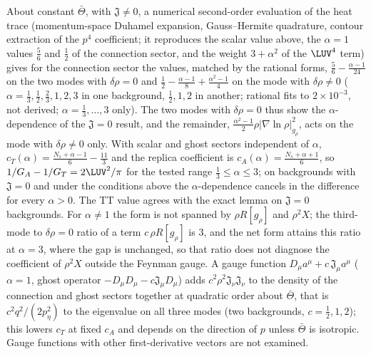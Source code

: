 About constant \(\bar\Theta\), with \(\mathfrak J\neq0\), a numerical second-order evaluation of the heat trace (momentum-space Duhamel expansion, Gauss--Hermite quadrature, contour extraction of the \(p^4\) coefficient; it reproduces the scalar value above, the \(\alpha=1\) values \(\tfrac56\) and \(\tfrac12\) of the connection sector, and the weight \(3+\alpha^2\) of the \(\LUV^4\) term) gives for the connection sector the values, matched by the rational forms, \(\tfrac56-\tfrac{\alpha-1}{24}\) on the two modes with \(\delta\rho=0\) and \(\tfrac12-\tfrac{\alpha-1}8+\tfrac{\alpha^2-1}4\) on the mode with \(\delta\rho\neq0\) (\(\alpha=\tfrac13,\tfrac12,\tfrac23,1,2,3\) in one background, \(\tfrac12,1,2\) in another; rational fits to \(2\times10^{-3}\), not derived; \(\alpha=\tfrac13,\dots,3\) only). The two modes with \(\delta\rho=0\) thus show the \(\alpha\)-dependence of the \(\mathfrak J=0\) result, and the remainder, \(\tfrac{\alpha^2-1}2\rho|\nabla\ln\rho|^2_{g_\rho}\), acts on the mode with \(\delta\rho\neq0\) only. With scalar and ghost sectors independent of \(\alpha\), \(c_T(\alpha)=\tfrac{N_s+\alpha-1}6-\tfrac{11}3\) and the replica coefficient is \(c_A(\alpha)=\tfrac{N_s+\alpha+1}6\), so \(1/G_A-1/G_T=2\LUV^2/\pi\) for the tested range \(\tfrac13\le\alpha\le3\); on backgrounds with \(\mathfrak J=0\) and under the conditions above the \(\alpha\)-dependence cancels in the difference for every \(\alpha>0\). The TT value agrees with the exact lemma on \(\mathfrak J=0\) backgrounds. For \(\alpha\neq1\) the form is not spanned by \(\rho R[g_\rho]\) and \(\rho^2X\); the third-mode to \(\delta\rho=0\) ratio of a term \(c\,\rho R[g_\rho]\) is \(3\), and the net form attains this ratio at \(\alpha=3\), where the gap is unchanged, so that ratio does not diagnose the coefficient of \(\rho^2X\) outside the Feynman gauge. A gauge function \(D_\mu a^\mu+c\,\mathfrak J_\mu a^\mu\) (\(\alpha=1\), ghost operator \(-D_\mu D_\mu-c\mathfrak J_\mu D_\mu\)) adds \(c^2\rho^2\mathfrak J_\nu\mathfrak J_\nu\) to the density of the connection and ghost sectors together at quadratic order about \(\bar\Theta\), that is \(c^2q^2/(2p_\eta^2)\) to the eigenvalue on all three modes (two backgrounds, \(c=\tfrac12,1,2\)); this lowers \(c_T\) at fixed \(c_A\) and depends on the direction of \(p\) unless \(\bar\Theta\) is isotropic. Gauge functions with other first-derivative vectors are not examined.

